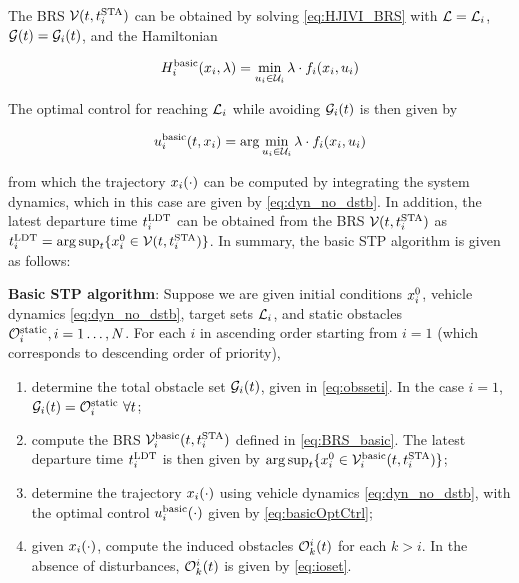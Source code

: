 The BRS $\mathcal{V}(t, t^\text{STA}_i)$ can be obtained by solving \eqref{eq:HJIVI_BRS} with $\mathcal{L} = \mathcal{L}_i$, $\mathcal{G}(t) = \mathcal{G}_i(t)$, and the Hamiltonian 

\begin{equation}
\label{eq:basicham}
\ham_i^\text{basic}(\state_i, \costate) = \min_{\ctrl_i\in\cset_i} \costate \cdot \fdyn_i(\state_i, \ctrl_i)
\end{equation}

The optimal control for reaching $\mathcal{L}_i$ while avoiding $\mathcal{G}_i(t)$ is then given by

\begin{equation}
\label{eq:basicOptCtrl}
\ctrl_i^\text{basic}(t, \state_i) = \arg \min_{\ctrl_i\in\cset_i} \costate \cdot \fdyn_i(\state_i, \ctrl_i)
\end{equation}

\noindent from which the trajectory $x_i(\cdot)$ can be computed by integrating the system dynamics, which in this case are given by \eqref{eq:dyn_no_dstb}. In addition, the latest departure time $t^\text{LDT}_i$ can be obtained from the BRS $\mathcal{V}(t, t^\text{STA}_i)$ as $t^\text{LDT}_i = \arg \sup_t \{x_i^0 \in \mathcal{V}(t, t^\text{STA}_i)\}$. In summary, the basic STP algorithm is given as follows:

\begin{alg}
\label{alg:basic}
\textbf{Basic STP algorithm}: Suppose we are given initial conditions $x_i^0$, vehicle dynamics \eqref{eq:dyn_no_dstb}, target sets $\mathcal{L}_i$, and static obstacles $\mathcal{O}^\text{static}_i, i = 1\ldots, N$. For each $i$ in ascending order starting from $i=1$ (which corresponds to descending order of priority),
\begin{enumerate}
\item determine the total obstacle set $\mathcal{G}_i(t)$, given in \eqref{eq:obsseti}. In the case $i=1$, $\mathcal{G}_i(t) = \mathcal{O}^\text{static}_i ~ \forall t$;
\item compute the BRS $\mathcal{V}_i^\text{basic}(t, t^\text{STA}_i)$ defined in \eqref{eq:BRS_basic}. The latest departure time $t^\text{LDT}_i$ is then given by $\arg \sup_t \{x^0_i \in \mathcal{V}_i^\text{basic}(t, t^\text{STA}_i)\}$;
\item determine the trajectory $x_i(\cdot)$ using vehicle dynamics \eqref{eq:dyn_no_dstb}, with the optimal control  $u_i^\text{basic}(\cdot)$ given by \eqref{eq:basicOptCtrl};
\item given $x_i(\cdot)$, compute the induced obstacles $\mathcal{O}_k^i(t)$ for each $k>i$. In the absence of disturbances, $\mathcal{O}_k^i(t)$ is given by \eqref{eq:ioset}.
\end{enumerate}
\end{alg}

